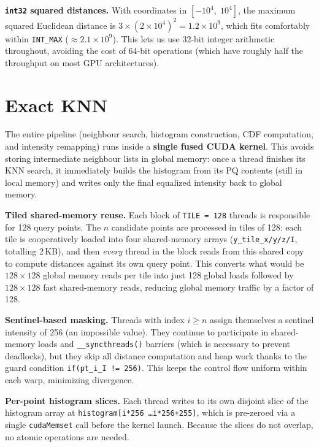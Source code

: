 \documentclass[11pt,a4paper]{article}
\begin{document}
\textbf{\texttt{int32} squared distances.}
With coordinates in $[-10^4,\;10^4]$, the maximum squared Euclidean distance is $3 \times (2 \times 10^4)^2 = 1.2 \times 10^9$, which fits comfortably within \texttt{INT\_MAX} ($\approx 2.1 \times 10^9$).
This lets us use 32-bit integer arithmetic throughout, avoiding the cost of 64-bit operations (which have roughly half the throughput on most GPU architectures).

\section{Exact KNN}

The entire pipeline (neighbour search, histogram construction, CDF computation, and intensity remapping) runs inside a \textbf{single fused CUDA kernel}.
This avoids storing intermediate neighbour lists in global memory: once a thread finishes its KNN search, it immediately builds the histogram from its PQ contents (still in local memory) and writes only the final equalized intensity back to global memory.

\textbf{Tiled shared-memory reuse.}
Each block of \texttt{TILE = 128} threads is responsible for 128 query points.
The $n$ candidate points are processed in tiles of 128: each tile is cooperatively loaded into four shared-memory arrays (\texttt{y\_tile\_x/y/z/I}, totalling 2\,KB), and then \emph{every} thread in the block reads from this shared copy to compute distances against its own query point.
This converts what would be $128 \times 128$ global memory reads per tile into just 128 global loads followed by $128 \times 128$ fast shared-memory reads, reducing global memory traffic by a factor of 128.

\textbf{Sentinel-based masking.}
Threads with index $i \geq n$ assign themselves a sentinel intensity of 256 (an impossible value).
They continue to participate in shared-memory loads and \texttt{\_\_syncthreads()} barriers (which is necessary to prevent deadlocks), but they skip all distance computation and heap work thanks to the guard condition \texttt{if(pt\_i\_I != 256)}.
This keeps the control flow uniform within each warp, minimizing divergence.

\textbf{Per-point histogram slices.}
Each thread writes to its own disjoint slice of the histogram array at \texttt{histogram[i*256 \ldots i*256+255]}, which is pre-zeroed via a single \texttt{cudaMemset} call before the kernel launch.
Because the slices do not overlap, no atomic operations are needed.
\end{document}
